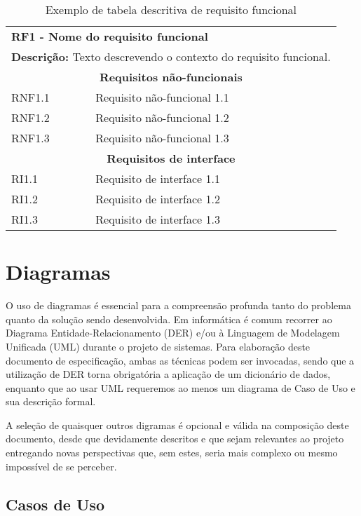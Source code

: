 \documentclass[12pt,openright,a4paper,brazil]{abntex2}
\begin{document}
\begin{table}
	\caption{Exemplo de tabela descritiva de requisito funcional}
	\label{tab:rf}
	\centering
	\begin{tabular}{|p{.2\linewidth}|p{.75\linewidth}|}
		\hline
		\multicolumn{2}{|l|}{
			\textbf{RF1 - Nome do requisito funcional}
		} \\
		\multicolumn{2}{|l|}{
			\textbf{Descrição:} Texto descrevendo o contexto do requisito funcional.
		} \\ \hline
		\multicolumn{2}{|c|}{
			\textbf{Requisitos não-funcionais}
		} \\ \hline
		RNF1.1 & Requisito não-funcional 1.1 \\ \hline
		RNF1.2 & Requisito não-funcional 1.2 \\ \hline
		RNF1.3 & Requisito não-funcional 1.3 \\ 
		\hline
		\multicolumn{2}{|c|}{
			\textbf{Requisitos de interface}
		} \\ \hline
		RI1.1 & Requisito de interface 1.1 \\ \hline
		RI1.2 & Requisito de interface 1.2 \\ \hline
		RI1.3 & Requisito de interface 1.3 \\
		\hline
	\end{tabular}
\end{table}


\chapter{Diagramas}

O uso de diagramas é essencial para a compreensão profunda tanto do problema quanto da solução sendo desenvolvida. Em informática é comum recorrer ao Diagrama Entidade-Relacionamento (DER) e/ou à Linguagem de Modelagem Unificada (UML) durante o projeto de sistemas. Para elaboração deste documento de especificação, ambas as técnicas podem ser invocadas, sendo que a utilização de DER torna obrigatória a aplicação de um dicionário de dados, enquanto que ao usar UML requeremos ao menos um diagrama de Caso de Uso e sua descrição formal. 

A seleção de quaisquer outros digramas é opcional e válida na composição deste documento, desde que devidamente descritos e que sejam relevantes ao projeto entregando novas perspectivas que, sem estes, seria mais complexo ou mesmo impossível de se perceber.

\section{Casos de Uso}
\end{document}
